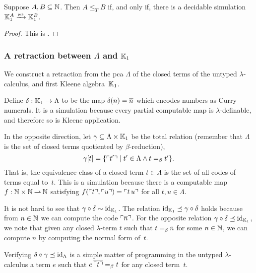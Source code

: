 \begin{theorem}
  Suppose $A, B \subseteq \NN$. Then $A \leq_T B$ if, and only if, there is a decidable simulation $\klone^A \pcato \klone^B$.
\end{theorem}

\begin{proof}
  This is \cite[Proposition 3.1.6]{Longley:94}.
\end{proof}

\subsubsection{A retraction between $\Lambda$ and $\klone$}
\label{ex:pcamorphism-K1-lambda}%

We construct a retraction from the pca $\Lambda$ of the closed terms of the untyped $\lambda$-calculus, and first Kleene algebra~$\klone$.

Define $\delta : \klone \to \Lambda$ to be the map $\delta(n) = \numeral{n}$ which encodes numbers as Curry numerals.
%
It is a simulation because every partial computable map is $\lambda$-definable, and therefore so is Kleene application.

In the opposite direction, let $\gamma \subseteq \Lambda \times \klone$ be the total relation (remember that $\Lambda$ is the set of closed terms quotiented by $\beta$-reduction),
%
\begin{equation*}
  \gamma[t] = \set{ \code{t'} \such t' \in \Lambda \land t =_\beta t' }.
\end{equation*}
%
That is, the equivalence class of a closed term $t \in \Lambda$ is the set of all codes of terms equal to~$t$.
This is a simulation because there is a computable map~$f : \NN \times \NN \parto \NN$ satisfying $f(\code{t}, \code{u}) = \code{t \, u}$ for all $t, u \in \Lambda$.

It is not hard to see that $\gamma \circ \delta \sim \id[\klone]$. The relation $\id[\klone] \preceq \gamma \circ \delta$ holds because from $n \in \NN$ we can compute the code $\code{\numeral{n}}$. For the opposite relation $\gamma \circ \delta \preceq \id[\klone]$, we note that given any closed $\lambda$-term $t$ such that $t =_\beta \overline{n}$ for some $n \in \NN$, we can compute $n$ by computing the normal form of~$t$.

Verifying $\delta \circ \gamma \preceq \id[\Lambda]$ is a simple matter of programming in the untyped $\lambda$-calculus a term $e$ such that $e \, \overline{\code{t}} =_\beta t$ for any closed term~$t$.


